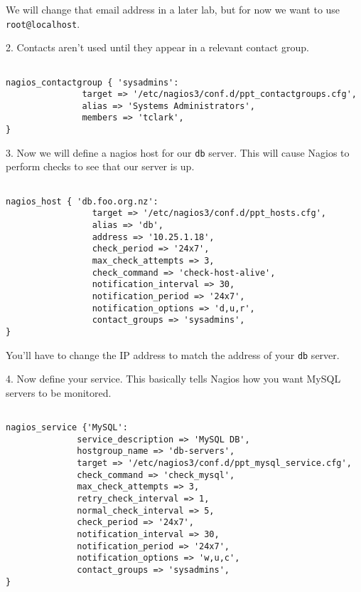 \documentclass{article}         %
\begin{document}
We will change that email address in a later lab, but for now we want to use
\texttt{root@localhost}.

2. Contacts aren't used until they appear in a relevant contact group.

\begin{verbatim}

nagios_contactgroup { 'sysadmins':
               target => '/etc/nagios3/conf.d/ppt_contactgroups.cfg',
               alias => 'Systems Administrators',
               members => 'tclark', 
}

  \end{verbatim}



3. Now we will define a nagios host for our \texttt{db} server.
This will cause Nagios to perform checks to see that our server
is up.

\begin{verbatim}

nagios_host { 'db.foo.org.nz':
                 target => '/etc/nagios3/conf.d/ppt_hosts.cfg',
                 alias => 'db',
                 address => '10.25.1.18',
                 check_period => '24x7',
                 max_check_attempts => 3,
                 check_command => 'check-host-alive',
                 notification_interval => 30,
                 notification_period => '24x7',
                 notification_options => 'd,u,r',
                 contact_groups => 'sysadmins',
}
\end{verbatim}


You'll have to change the IP address to match the address of
your \texttt{db} server.

4. Now define your service.  This basically tells Nagios
how you want MySQL servers to be monitored.

\begin{verbatim}

nagios_service {'MySQL':
              service_description => 'MySQL DB',
              hostgroup_name => 'db-servers',
              target => '/etc/nagios3/conf.d/ppt_mysql_service.cfg',
              check_command => 'check_mysql',
              max_check_attempts => 3,
              retry_check_interval => 1,
              normal_check_interval => 5,
              check_period => '24x7',
              notification_interval => 30,
              notification_period => '24x7',
              notification_options => 'w,u,c',
              contact_groups => 'sysadmins',
}
\end{verbatim}
\end{document}
